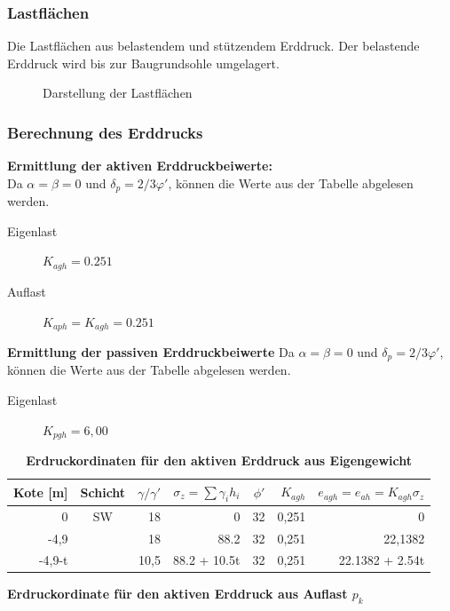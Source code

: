 \documentclass[11pt,fleqn,a4paper,halfparskip]{article}
\begin{document}
\subsubsection{Lastflächen}
Die Lastflächen aus belastendem und stützendem Erddruck. Der belastende Erddruck wird bis zur Baugrundsohle umgelagert. 
\begin{figure}[h]
\vspace{8cm}
\caption[Lastflächen Aufgabe 2]{Darstellung der Lastflächen \cite{me}}
\end{figure}
\subsubsection{Berechnung des Erddrucks}
\textbf{Ermittlung der aktiven Erddruckbeiwerte:}\\
Da $\alpha = \beta = 0$ und $\delta_p = 2/3\varphi'$, können die Werte aus der Tabelle \cite[S.83]{wsp} abgelesen werden.
\begin{description}
\item[Eigenlast] $K_{agh} = 0.251$
\item[Auflast] $K_{aph} = K_{agh} = 0.251$
\end{description}
\textbf{Ermittlung der passiven Erddruckbeiwerte}
Da $\alpha = \beta = 0$ und $\delta_p = 2/3\varphi'$, können die Werte aus der Tabelle \cite[S.89]{wsp} abgelesen werden.
\begin{description}
\item[Eigenlast] $K_{pgh} = 6,00$
\end{description}
\begin{table}[htbp]
\caption{\textbf{Erdruckordinaten für den aktiven Erddruck aus Eigengewicht}}

\begin{tabular}{|r|c|r|r|r|r|r|}
\hline
Kote [m] & Schicht & $\gamma / \gamma'$ & $\sigma_z = \sum\gamma_ih_i$ & $\phi'$ & $K_{agh}$ & $e_{agh} = e_{ah} = K_{agh}\sigma_z$  \\ \hline
0 & SW & 18 & 0 & 32 & 0,251 & 0   \\ \cline{ 1- 1}\cline{ 3- 7}
-4,9 &  & 18 & 88.2 & 32 & 0,251 & 22,1382   \\ \cline{ 1- 1}\cline{ 3- 7}
 -4,9-t &  & 10,5 & 88.2 + 10.5t & 32 & 0,251 & 22.1382 + 2.54t \\ \hline
\end{tabular}
\label{}
\end{table}
\textbf{Erdruckordinate für den aktiven Erddruck aus Auflast $p_k$} \\
\end{document}
